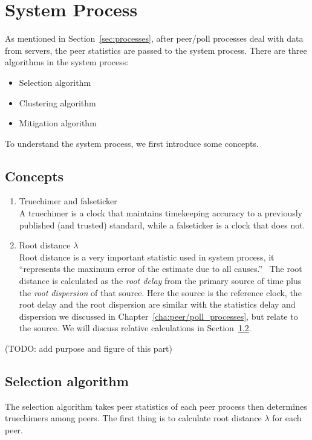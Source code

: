 

\chapter{System Process}
\label{cha:system_process}

As mentioned in Section~\ref{sec:processes}, after peer/poll processes deal
with data from servers, the peer statistics are passed to the system process.
There are three algorithms in the system process:
\begin{itemize}
    \item Selection algorithm
    \item Clustering algorithm
    \item Mitigation algorithm
\end{itemize}

To understand the system process, we first introduce some concepts.

\section{Concepts}%
\label{sec:system_concepts}
\begin{enumerate}
    \item Truechimer and falseticker\\
        A truechimer is a clock that maintains timekeeping accuracy to a
        previously published (and trusted) standard, while a falseticker is a
        clock that does not.
    \item Root distance $\lambda$\\
        Root distance is a very important statistic used in system process, it
        ``represents the maximum error of the estimate due to all
        causes.''~\cite{performance_metrics} The root distance is calculated as
        the \emph{root delay} from the primary source of time plus the
        \emph{root dispersion} of that source. Here the source is the reference
        clock, the root delay and the root dispersion are similar with the
        statistics delay and dispersion we discussed in
        Chapter~\ref{cha:peer/poll_processes}, but relate to the source. We
        will discuss relative calculations in
        Section~\ref{sec:selection_algorithm}.
\end{enumerate}

(TODO: add purpose and figure of this part)

\section{Selection algorithm}%
\label{sec:selection_algorithm}
The selection algorithm takes peer statistics of each peer process then
determines truechimers among peers. The first thing is to calculate root
distance $\lambda$ for each peer.

